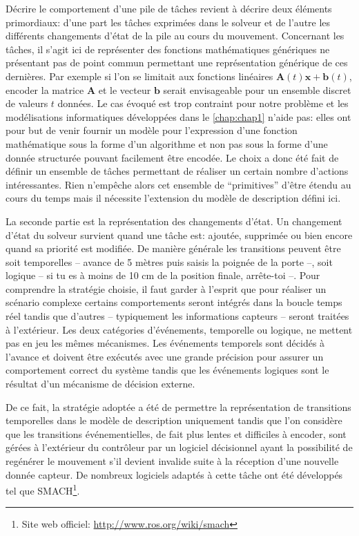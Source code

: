 Décrire le comportement d'une pile de tâches
revient à décrire deux éléments primordiaux: d'une part les tâches
exprimées dans le solveur et de l'autre les différents changements
d'état de la pile au cours du mouvement. Concernant les
tâches, il s'agit ici de représenter des fonctions
mathématiques génériques ne présentant pas de point commun permettant
une représentation générique de ces dernières. Par exemple si l'on se
limitait aux fonctions linéaires $\mathbf{A}(t) \mathbf{x} +
\mathbf{b}(t)$, encoder la matrice $\mathbf{A}$ et le vecteur
$\mathbf{b}$ serait envisageable pour un ensemble discret de valeurs
$t$ données. Le cas évoqué est trop contraint pour notre problème et
les modélisations informatiques développées dans le
\autoref{chap:chap1} n'aide pas: elles ont pour but de venir fournir
un modèle pour l'expression d'une fonction mathématique sous la forme
d'un algorithme et non pas sous la forme d'une donnée structurée
pouvant facilement être encodée. Le choix a donc été fait de définir
un ensemble de tâches permettant de réaliser un certain nombre
d'actions intéressantes. Rien n'empêche alors cet ensemble de
``primitives'' d'être étendu au cours du temps mais il nécessite
l'extension du modèle de description défini ici.


La seconde partie est la représentation des changements d'état. Un
changement d'état du solveur survient quand une tâche est: ajoutée,
supprimée ou bien encore quand sa priorité est modifiée. De manière
générale les transitions peuvent être soit temporelles -- avance de 5
mètres puis saisis la poignée de la porte --, soit logique -- si tu es
à moins de 10 cm de la position finale, arrête-toi --. Pour comprendre
la stratégie choisie, il faut garder à l'esprit que pour réaliser un
scénario complexe certains comportements seront intégrés dans la
boucle temps réel tandis que d'autres -- typiquement les informations
capteurs -- seront traitées à l'extérieur. Les deux catégories
d'événements, temporelle ou logique, ne mettent pas en jeu les mêmes
mécanismes. Les événements temporels sont décidés à l'avance et
doivent être exécutés avec une grande précision pour assurer un
comportement correct du système tandis que les événements logiques
sont le résultat d'un mécanisme de décision externe.

De ce fait, la stratégie adoptée a été de permettre la représentation
de transitions temporelles dans le modèle de description uniquement
tandis que l'on considère que les transitions événementielles, de fait
plus lentes et difficiles à encoder, sont gérées à l'extérieur du
contrôleur par un logiciel décisionnel ayant la possibilité de
regénérer le mouvement s'il devient invalide suite à la réception
d'une nouvelle donnée capteur. De nombreux logiciels adaptés à cette
tâche ont été développés tel que SMACH\footnote{Site web officiel:
  \url{http://www.ros.org/wiki/smach}}.


